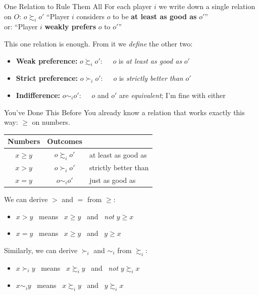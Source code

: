 \begin{frame}{One Relation to Rule Them All}
For each player $i$ we write down a single relation on $O$:
\bsk
\centering
\large
$o \succsim_i o'$
\bsk
\normalsize
``Player $i$ considers $o$ to be \textbf{at least as good as} $o'$''\\
or: ``Player $i$ \textbf{weakly prefers} $o$ to $o'$''
\bsk
\raggedright
\vfill
This one relation is enough. From it we \textit{define} the other two:
\bsk
\begin{itemize}
    \item \textbf{Weak preference:} $o \succsim_i o':\quad$ $o$ is \textit{at least as good as} $o'$
    \item \textbf{Strict preference:} $o\succ_i o':\quad$ $o$ is \textit{strictly better than} $o'$
    \item \textbf{Indifference:} \hspace{0.16in} $o\sim_i o':\quad$ $o$ and $o'$ are \textit{equivalent}; I'm fine with either
\end{itemize}
\end{frame}

\begin{frame}{You've Done This Before}
You already know a relation that works exactly this way: $\ge$ on numbers.
\bsk
\centering
\begin{tabular}{|c|c|l|}
\hline
\textbf{Numbers} & \textbf{Outcomes} & \\
\hline
$x\ge y$ & $o\succsim_i o'$ & at least as good as \\
\hline
$x> y$ & $o\succ_i o'$ & strictly better than \\
\hline
$x= y$ & $o\sim_i o'$ & just as good as \\
\hline
\end{tabular}
\bsk
\raggedright
We can derive $>$ and $=$ from $\geq$:
\begin{itemize}
    \item $x>y$ \ means \ $x\ge y$ \ and \ \textit{not} $y\ge x$
    \item $x=y$ \ means \ $x\ge y$ \ and \ $y\ge x$
\end{itemize}
Similarly, we can derive $\succ_i$ and $\sim_i$ from $\succsim_i$:
\begin{itemize}
    \item $x\succ_i y$ \ means \ $x\succsim_i y$ \ and \ \textit{not} $y\succsim_i x$
    \item $x\sim_i y$ \ means \ $x\succsim_i y$ \ and \ $y\succsim_i x$
\end{itemize}
\end{frame}


